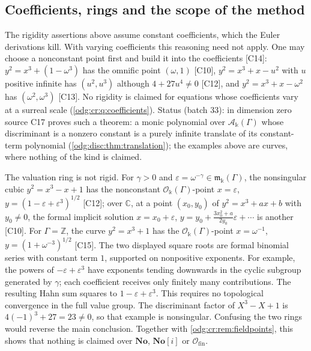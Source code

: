 \documentclass[11pt,oneside]{article}
\numberwithin{equation}{section}
\theoremstyle{definition}
\theoremstyle{remark}
\newcommand{\No}{\mathbf{No}}
\newcommand{\Z}{\mathbb Z}
\newcommand{\C}{\mathbb C}
\newcommand{\src}[1]{\textup{\textsf{\small[#1]}}}
\newcommand{\Ofin}{\mathcal O_{\mathrm{fin}}}
\newcommand{\crA}{\mathcal A_\Bbbk(\Gamma)}
\newcommand{\crO}{\mathcal O_\Bbbk(\Gamma)}
\newcommand{\crm}{\mathfrak m_\Bbbk(\Gamma)}
\begin{document}
\subsection{Coefficients, rings and the scope of the method}\label{odg:cr:sub:boundaries}

The rigidity assertions above assume constant coefficients, which the Euler
derivations kill. With varying coefficients this reasoning need not apply.
One may choose a nonconstant point first and build it into the
coefficients \src{C14}: $y^2=x^3+(1-\omega^3)$ has the omnific point $(\omega,1)$
\src{C10}, $y^2=x^3+x-u^2$ with $u$ positive infinite has $(u^2,u^3)$ although
$4+27u^4\ne0$ \src{C12}, and $y^2=x^3+x-\omega^2$ has $(\omega^2,\omega^3)$ \src{C13}.
No rigidity is claimed for equations whose coefficients vary at a surreal scale
(\cref{odg:cr:q:coefficients}).
Status (batch 33): in dimension zero source C17 proves such a theorem: a monic polynomial
over $\crA$ whose discriminant is a nonzero constant is a purely infinite translate of its
constant-term polynomial (\cref{odg:disc:thm:translation}); the examples above are curves,
where nothing of the kind is claimed.

The valuation ring is not rigid. For $\gamma>0$ and $\varepsilon=\omega^{-\gamma}\in\crm$,
the nonsingular cubic $y^2=x^3-x+1$ has the nonconstant $\crO$-point $x=\varepsilon$,
$y=(1-\varepsilon+\varepsilon^3)^{1/2}$ \src{C12}; over $\C$, at a point $(x_0,y_0)$ of
$y^2=x^3+ax+b$ with $y_0\ne0$, the formal implicit solution
$x=x_0+\varepsilon$, $y=y_0+\tfrac{3x_0^2+a}{2y_0}\varepsilon+\cdots$ is another
\src{C10}. For $\Gamma=\Z$, the curve $y^2=x^3+1$ has the $\crO$-point
$x=\omega^{-1}$,
$y=(1+\omega^{-3})^{1/2}$ \src{C15}. The two displayed square roots are formal binomial
series with constant term $1$, supported on nonpositive exponents. For example,
the powers of $-\varepsilon+\varepsilon^3$ have exponents tending downwards
in the cyclic subgroup generated by $\gamma$; each coefficient receives
only finitely many contributions. The resulting Hahn sum squares to
$1-\varepsilon+\varepsilon^3$. This requires no topological convergence
in the full value group. The discriminant factor of $X^3-X+1$ is
$4(-1)^3+27=23\ne0$, so that example is nonsingular.
Confusing the two rings would reverse the main conclusion. Together with
\cref{odg:cr:rem:fieldpoints}, this shows that nothing is claimed over $\No$, $\No[i]$
or $\Ofin$.
\end{document}
